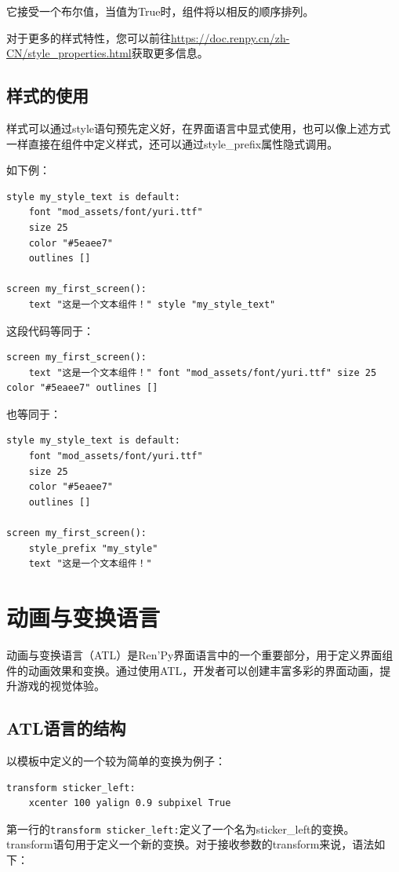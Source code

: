 \documentclass[../../Main.tex]{subfiles}
\begin{document}
它接受一个布尔值，当值为True时，组件将以相反的顺序排列。

对于更多的样式特性，您可以前往\url{https://doc.renpy.cn/zh-CN/style_properties.html}获取更多信息。

\subsection{样式的使用}
样式可以通过style语句预先定义好，在界面语言中显式使用，也可以像上述方式一样直接在组件中定义样式，还可以通过style\_prefix属性隐式调用。

如下例：
\begin{lstlisting}
style my_style_text is default:
    font "mod_assets/font/yuri.ttf"
    size 25
    color "#5eaee7"
    outlines []

screen my_first_screen():
    text "这是一个文本组件！" style "my_style_text"
\end{lstlisting}

这段代码等同于：
\begin{lstlisting}
screen my_first_screen():
    text "这是一个文本组件！" font "mod_assets/font/yuri.ttf" size 25 color "#5eaee7" outlines []
\end{lstlisting}

也等同于：
\begin{lstlisting}
style my_style_text is default:
    font "mod_assets/font/yuri.ttf"
    size 25
    color "#5eaee7"
    outlines []

screen my_first_screen():
    style_prefix "my_style"
    text "这是一个文本组件！"
\end{lstlisting}

\section{动画与变换语言}
动画与变换语言（ATL）是Ren'Py界面语言中的一个重要部分，用于定义界面组件的动画效果和变换。通过使用ATL，开发者可以创建丰富多彩的界面动画，提升游戏的视觉体验。

\subsection{ATL语言的结构}
以模板中定义的一个较为简单的变换为例子：
\begin{lstlisting}
transform sticker_left:
    xcenter 100 yalign 0.9 subpixel True
\end{lstlisting}

第一行的\verb|transform sticker_left:|定义了一个名为sticker\_left的变换。transform语句用于定义一个新的变换。对于接收参数的transform来说，语法如下：
\end{document}
